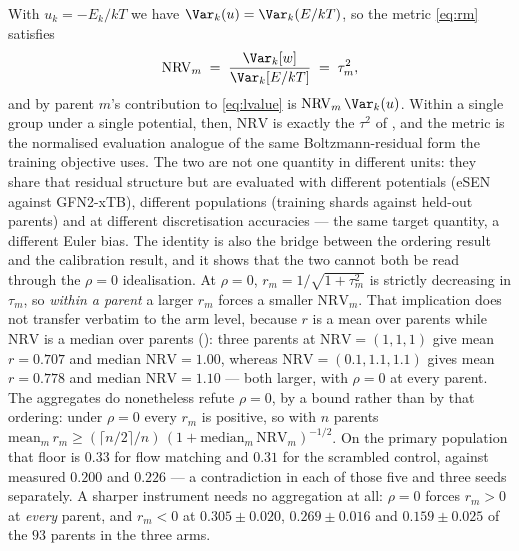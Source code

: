 \begin{remark}
\label{rem:nrvtau}
With $u_k = -E_k/kT$ we have $\Var_k(u) = \Var_k(E/kT)$, so the metric
\eqref{eq:rm} satisfies
\begin{equation}
  \mathrm{NRV}_m \;=\; \frac{\Var_k[w]}{\Var_k[E/kT]} \;=\; \tau_m^{2},
  \label{eq:app-nrvtau}
\end{equation}
and by  parent $m$'s contribution to \eqref{eq:lvalue} is
$\mathrm{NRV}_m\,\Var_k(u)$. Within a single group under a single potential, then,
$\mathrm{NRV}$ is exactly the $\tau^2$ of , and the metric is
the normalised evaluation analogue of the same Boltzmann-residual form the training
objective uses. The two are not one quantity in different units: they share that
residual structure but are evaluated with different potentials (eSEN against
GFN2-xTB), different populations (training shards against held-out parents) and at
different discretisation accuracies --- the same target quantity, a different Euler
bias. The identity is also the
bridge between the ordering result and
the calibration result, and it shows that the two cannot both be read through the
$\rho = 0$ idealisation. At $\rho = 0$, $r_m = 1/\sqrt{1+\tau_m^2}$ is strictly
decreasing in $\tau_m$, so \emph{within a parent} a larger $r_m$ forces a smaller
$\mathrm{NRV}_m$. That implication does not transfer verbatim to the arm level,
because $r$ is a mean over parents while $\mathrm{NRV}$ is a median over parents
(): three parents at $\mathrm{NRV} = (1,1,1)$ give mean
$r = 0.707$ and median $\mathrm{NRV} = 1.00$, whereas $\mathrm{NRV} = (0.1,1.1,1.1)$
gives mean $r = 0.778$ and median $\mathrm{NRV} = 1.10$ --- both larger, with
$\rho = 0$ at every parent. The aggregates do nonetheless refute $\rho = 0$, by a
bound rather than by that ordering: under $\rho = 0$ every $r_m$ is positive, so with
$n$ parents $\mathrm{mean}_m\, r_m \ge (\lceil n/2\rceil / n)\,(1 +
\mathrm{median}_m\,\mathrm{NRV}_m)^{-1/2}$. On the primary population that floor is
$0.33$ for flow matching and $0.31$ for the scrambled control, against measured
$0.200$ and $0.226$ --- a contradiction in each of those five and three seeds
separately. A sharper instrument needs no aggregation at all: $\rho = 0$ forces
$r_m > 0$ at \emph{every} parent, and $r_m < 0$ at $0.305 \pm 0.020$,
$0.269 \pm 0.016$ and $0.159 \pm 0.025$ of the $93$ parents in the three arms.


\end{remark}
